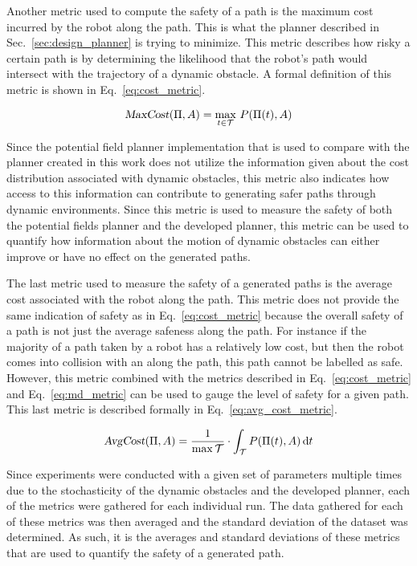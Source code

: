 Another metric used to compute the safety of a path is the maximum cost
incurred by the robot along the path. This is what the planner described in
Sec.~\ref{sec:design_planner} is trying to minimize. This metric describes how
risky a certain path is by determining the likelihood that the robot's path
would intersect with the trajectory of a dynamic obstacle. A formal definition
of this metric is shown in Eq.~\ref{eq:cost_metric}.

\begin{equation}
    \Var{MaxCost}(\Pi, A) = \max_{t \in \mathcal{T}} \, P(\Pi(t), A)
    \label{eq:cost_metric}
\end{equation}

Since the potential field planner implementation that is used to compare with
the planner created in this work does not utilize the information given about
the cost distribution associated with dynamic obstacles, this metric also
indicates how access to this information can contribute to generating safer
paths through dynamic environments. Since this metric is used to measure the
safety of both the potential fields planner and the developed planner, this
metric can be used to quantify how information about the motion of dynamic
obstacles can either improve or have no effect on the generated paths.

The last metric used to measure the safety of a generated paths is the average
cost associated with the robot along the path. This metric does not provide the
same indication of safety as in Eq.~\ref{eq:cost_metric} because the overall
safety of a path is not just the average safeness along the path. For instance
if the majority of a path taken by a robot has a relatively low cost, but then
the robot comes into collision with an along the path, this path cannot be
labelled as safe. However, this metric combined with the metrics described in
Eq.~\ref{eq:cost_metric} and Eq.~\ref{eq:md_metric} can be used to gauge the
level of safety for a given path. This last metric is described formally in
Eq.~\ref{eq:avg_cost_metric}.

\begin{equation}
    \Var{AvgCost}(\Pi, A) = \frac{1}{\max \mathcal{T}} \cdot
    \int_{\mathcal{T}} P(\Pi(t), A) \, \mathrm{d}t
    \label{eq:avg_cost_metric}
\end{equation}

Since experiments were conducted with a given set of parameters multiple times
due to the stochasticity of the dynamic obstacles and the developed planner,
each of the metrics were gathered for each individual run. The data gathered
for each of these metrics was then averaged and the standard deviation of the
dataset was determined. As such, it is the averages and standard deviations of
these metrics that are used to quantify the safety of a generated path.

